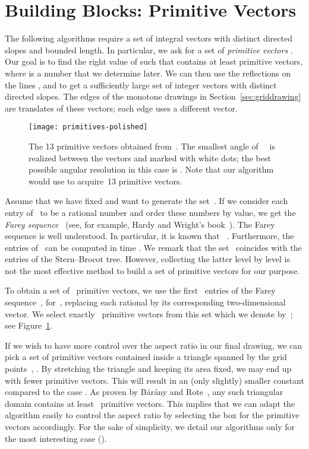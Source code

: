 \documentclass[a4paper,11pt]{article}
\theoremstyle{plain}
\begin{document}
\section{Building Blocks: Primitive Vectors}
\label{sec:primitive}

The following algorithms require a set of integral vectors with distinct 
directed slopes and bounded length. In particular, we ask for a set of 
\emph{primitive vectors} .
Our goal is to find the right value of  such that  contains
at least  primitive vectors, where  is a number that we determine later. 
We can then use the reflections on the lines ,  and  to
get a sufficiently large set of integer vectors with  distinct
directed slopes.  The edges of the monotone drawings in
Section~\ref{sec:griddrawing} are translates of these vectors; each edge 
uses a different vector. 

\begin{figure}[tb]
  \centering
  \texttt{[image: primitives-polished]}
  \caption{The 13 primitive vectors obtained from~. The
    smallest angle of~~ is realized between the
    vectors  and  marked with white dots; the best
    possible angular resolution in this case is . Note that our algorithm would use  to
    acquire~13 primitive vectors.}
  \label{fig:primitive}
\end{figure}

Assume that we have fixed  and want to generate the set~. If we
consider each entry  of~ to be a rational number  and
order these numbers by value, we get the \emph{Farey sequence}~ 
(see, for example, Hardy and Wright's book~\cite{gw-itn-79}). 
The Farey sequence is well understood. In particular, it is known that
~\cite[Theorem~331]{gw-itn-79}. 
Furthermore, the entries of~ can 
be computed in time .  We remark that the set~ coincides with the entries of the
Stern--Brocot tree.  However, collecting the latter level by level is
not the most effective method to build a set of primitive vectors for
our purpose. 

To obtain a set of~ primitive vectors, we use the first~
entries of the Farey sequence~, for~, 
replacing each rational by its corresponding two-dimensional vector.  
We select exactly~ primitive vectors from this set which we denote by~;
see Figure~\ref{fig:primitive}.

If we wish to have more control over the aspect ratio in our final drawing, we 
can pick a set of primitive vectors contained inside a triangle spanned
by the grid points~, . By stretching the triangle and 
keeping its area fixed, we may end up with fewer primitive vectors.
This will result in an (only slightly) smaller constant compared to
the case .  
As proven by B\'ar\'any and Rote~\cite[Theorem~2]{br-scdpg-06}, any such
triangular domain contains at least~ primitive
vectors. This implies that we can adapt
the algorithm easily to control the
aspect ratio by selecting the box for the primitive vectors 
accordingly. For the sake of simplicity, we detail our algorithms only
for the most interesting case ().
\end{document}
